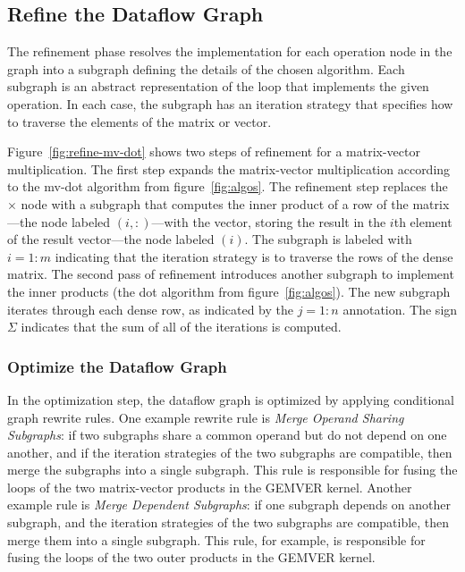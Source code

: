 \documentclass[11pt]{article}
\begin{document}
\subsection{Refine the Dataflow Graph}
\label{sec:refine}

The refinement phase resolves the implementation for each operation node in the graph into a subgraph defining the details of the chosen algorithm.  Each subgraph is an abstract representation of the loop that implements the given operation.  In each case, the subgraph has an iteration strategy that specifies how to traverse the elements of the matrix or vector.

Figure~\ref{fig:refine-mv-dot} shows two steps of refinement for a matrix-vector multiplication. The first step expands the matrix-vector multiplication according to the mv-dot algorithm from figure~\ref{fig:algos}.  The refinement step replaces the $\times$ node with a subgraph that computes the inner product of a row of the matrix---the node labeled $(i,:)$---with the vector, storing the result in the $i$th element of the result vector---the node labeled $(i)$. The subgraph is labeled with $i=1\!:\!m$ indicating that the iteration strategy is to traverse the rows of the dense matrix.
%
The second pass of refinement introduces another subgraph to implement the inner products (the dot algorithm from figure~\ref{fig:algos}). The new subgraph iterates through each dense row, as indicated by the $j=1:n$ annotation. The sign $\Sigma$ indicates that the sum of all of the iterations is computed.


\begin{figure*}[btp]
  \centering

  \caption{The refinement of a matrix-vector product to a set of inner products and the refinement of inner products to scalar multiplications and additions.}
  \label{fig:refine-mv-dot}
\end{figure*}




\subsubsection{Optimize the Dataflow Graph}

In the optimization step, the dataflow graph is optimized by applying conditional graph rewrite rules.  One example rewrite rule is \emph{Merge Operand Sharing Subgraphs}: if two subgraphs share a common operand but do not depend on one another, and if the iteration strategies of the two subgraphs are compatible, then merge the subgraphs into a single subgraph.  This rule is responsible for fusing the loops of the two matrix-vector products in the GEMVER kernel.  Another example rule is \emph{Merge Dependent Subgraphs}: if one subgraph depends on another subgraph, and the iteration strategies of the two subgraphs are compatible, then merge them into a single subgraph.  This rule, for example, is responsible for fusing the loops of the two outer products in the GEMVER kernel.
\end{document}
